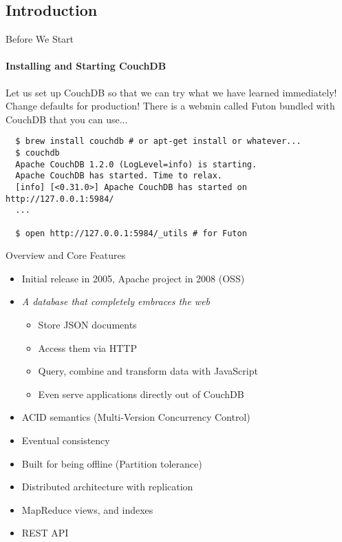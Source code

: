 \documentclass{beamer}
\begin{document}
\subsection{Introduction}
\begin{frame}[fragile]{Before We Start}
  \framesubtitle{Installing and Starting CouchDB}
  Let us set up CouchDB so that we can try what we have learned immediately!
  Change defaults for production! There is a webmin called Futon
  bundled with CouchDB that you can use...
  \fontsize{6}{8}\selectfont
  \begin{verbatim}
  $ brew install couchdb # or apt-get install or whatever...
  $ couchdb
  Apache CouchDB 1.2.0 (LogLevel=info) is starting.
  Apache CouchDB has started. Time to relax.
  [info] [<0.31.0>] Apache CouchDB has started on http://127.0.0.1:5984/
  ...

  $ open http://127.0.0.1:5984/_utils # for Futon
  \end{verbatim}
\end{frame}

\begin{frame}{Overview and Core Features}
  \begin{itemize}
    \item Initial release in 2005, Apache project in 2008 (OSS)
    \item \textit{A database that completely embraces the web}
    \begin{itemize}
      \item Store JSON documents
      \item Access them via HTTP
      \item Query, combine and transform data with JavaScript
      \item Even serve applications directly out of CouchDB
    \end{itemize}
    \item ACID semantics (Multi-Version Concurrency Control)
    \item Eventual consistency
    \item Built for being offline (Partition tolerance)
    \item Distributed architecture with replication
    \item MapReduce views, and indexes
    \item REST API
  \end{itemize}
\end{frame}
\end{document}
